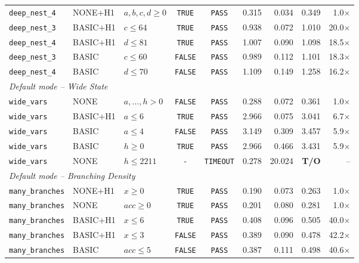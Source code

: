 {\begin{longtable}{p{} p{} p{} c c r r r r}
\texttt{deep\_nest\_4} & NONE$+$H1 & $a,b,c,d \geq 0$ & \texttt{TRUE} & \texttt{PASS} & 0.315 & 0.034 & 0.349 & 1.0$\times$ \\
\texttt{deep\_nest\_3} & BASIC$+$H1 & $c \leq 64$ & \texttt{TRUE} & \texttt{PASS} & 0.938 & 0.072 & 1.010 & 20.0$\times$ \\
\texttt{deep\_nest\_4} & BASIC$+$H1 & $d \leq 81$ & \texttt{TRUE} & \texttt{PASS} & 1.007 & 0.090 & 1.098 & 18.5$\times$ \\
\texttt{deep\_nest\_3} & BASIC & $c \leq 60$ & \texttt{FALSE} & \texttt{PASS} & 0.989 & 0.112 & 1.101 & 18.3$\times$ \\
\texttt{deep\_nest\_4} & BASIC & $d \leq 70$ & \texttt{FALSE} & \texttt{PASS} & 1.109 & 0.149 & 1.258 & 16.2$\times$ \\
\midrule
\multicolumn{9}{l}{\textit{Default mode -- Wide State}} \\
\midrule
\texttt{wide\_vars} & NONE & $a,{\ldots},h > 0$ & \texttt{FALSE} & \texttt{PASS} & 0.288 & 0.072 & 0.361 & 1.0$\times$ \\
\texttt{wide\_vars} & BASIC$+$H1 & $a \leq 6$ & \texttt{TRUE} & \texttt{PASS} & 2.966 & 0.075 & 3.041 & 6.7$\times$ \\
\texttt{wide\_vars} & BASIC & $a \leq 4$ & \texttt{FALSE} & \texttt{PASS} & 3.149 & 0.309 & 3.457 & 5.9$\times$ \\
\texttt{wide\_vars} & BASIC & $h \geq 0$ & \texttt{TRUE} & \texttt{PASS} & 2.966 & 0.466 & 3.431 & 5.9$\times$ \\
\texttt{wide\_vars} & NONE & $h \leq 2211$ & - & {\color{red}\texttt{TIMEOUT}} & 0.278 & 20.024 & \textbf{T/O} & -- \\
\midrule
\multicolumn{9}{l}{\textit{Default mode -- Branching Density}} \\
\midrule
\texttt{many\_branches} & NONE$+$H1 & $x \geq 0$ & \texttt{TRUE} & \texttt{PASS} & 0.190 & 0.073 & 0.263 & 1.0$\times$ \\
\texttt{many\_branches} & NONE & $\mathit{acc} \geq 0$ & \texttt{TRUE} & \texttt{PASS} & 0.201 & 0.080 & 0.281 & 1.0$\times$ \\
\texttt{many\_branches} & BASIC$+$H1 & $x \leq 6$ & \texttt{TRUE} & \texttt{PASS} & 0.408 & 0.096 & 0.505 & 40.0$\times$ \\
\texttt{many\_branches} & BASIC$+$H1 & $x \leq 3$ & \texttt{FALSE} & \texttt{PASS} & 0.389 & 0.090 & 0.478 & 42.2$\times$ \\
\texttt{many\_branches} & BASIC & $\mathit{acc} \leq 5$ & \texttt{FALSE} & \texttt{PASS} & 0.387 & 0.111 & 0.498 & 40.6$\times$ \\

\end{longtable}}

